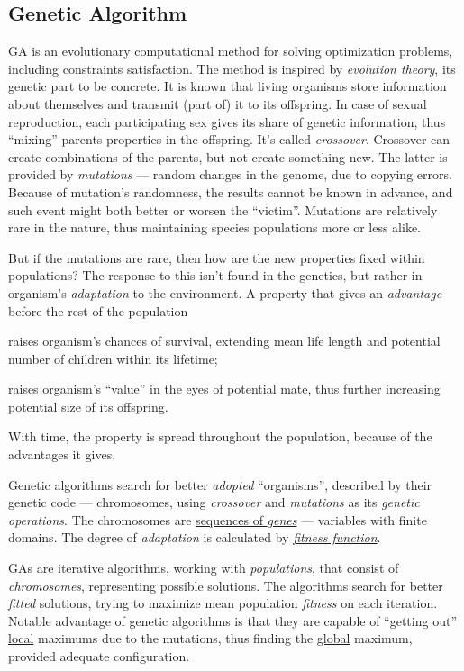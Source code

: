 \documentclass[../header]{subfiles}
\begin{document}
\providecommand{\rootdir}{..}



\subsection{Genetic Algorithm}
GA is an evolutionary computational method for solving optimization problems,
including constraints satisfaction. The method is inspired by \emph{evolution
theory}, its genetic part to be concrete. It is known that living organisms
store information about themselves and transmit (part of) it to its offspring.
In case of sexual reproduction, each participating sex gives its share of
genetic information, thus ``mixing'' parents properties in the offspring.
It's called \emph{crossover}.
Crossover can create combinations of the parents, but not create something new.
The latter is provided by \emph{mutations} --- random changes in the genome, due
to copying errors. Because of mutation's randomness, the results cannot be known
in advance, and such event might both better or worsen the ``victim''. Mutations
are relatively rare in the nature, thus maintaining species populations more or
less alike.

But if the mutations are rare, then how are the new properties fixed within
populations? The response to this isn't found in the genetics, but rather in
organism's \emph{adaptation} to the environment. A property that gives an
\emph{advantage} before the rest of the population
\begin{enumerate*}[1)]
  \item raises organism's chances of survival, extending mean life length and
        potential number of children within its lifetime;
  \item raises organism's ``value'' in the eyes of potential mate, thus further
        increasing potential size of its offspring.
\end{enumerate*}
With time, the property is spread throughout the population, because of the
advantages it gives.

\bigskip\noindent
Genetic algorithms search for better \emph{adopted} ``organisms'', described
by their genetic code --- chromosomes, using \emph{crossover} and \emph{mutations}
as its \emph{genetic operations}.
The chromosomes are \underline{sequences of \emph{genes}} --- variables with finite
domains. The degree of \emph{adaptation} is calculated by
\underline{\emph{fitness function}}.

GAs are iterative algorithms, working with \emph{populations}, that consist of
\emph{chromosomes}, representing possible solutions. The algorithms search
for better \emph{fitted} solutions, trying to maximize mean population
\emph{fitness} on each iteration.
Notable advantage of genetic algorithms is that they are capable of
``getting out'' \underline{local} maximums due to the mutations, thus finding
the \underline{global} maximum, provided adequate configuration.
\end{document}
